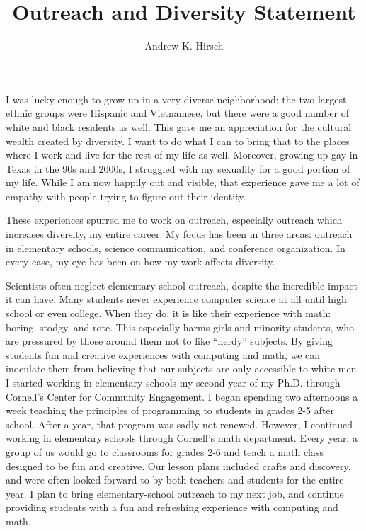 \documentclass{article}
\author{Andrew K. Hirsch}
\title{Outreach and Diversity Statement}
\date{}
\theoremstyle{definition}
\begin{document}
\maketitle

I was lucky enough to grow up in a very diverse neighborhood: the two largest ethnic groups were Hispanic and Vietnamese, but there were a good number of white and black residents as well.
This gave me an appreciation for the cultural wealth created by diversity.
I want to do what I can to bring that to the places where I work and live for the rest of my life as well.
Moreover, growing up gay in Texas in the 90s and 2000s, I struggled with my sexuality for a good portion of my life.
While I am now happily out and visible, that experience gave me a lot of empathy with people trying to figure out their identity.

These experiences spurred me to work on outreach, especially outreach which increases diversity, my entire career.
My focus has been in three areas: outreach in elementary schools, science communication, and conference organization.
In every case, my eye has been on how my work affects diversity.

Scientists often neglect elementary-school outreach, despite the incredible impact it can have.
Many students never experience computer science at all until high school or even college.
When they do, it is like their experience with math: boring, stodgy, and rote.
This especially harms girls and minority students, who are pressured by those around them not to like ``nerdy'' subjects.
By giving students fun and creative experiences with computing and math, we can inoculate them from believing that our subjects are only accessible to white men.
I started working in elementary schools my second year of my Ph.D. through Cornell's Center for Community Engagement.
I began spending two afternoons a week teaching the principles of programming to students in grades 2-5 after school.
After a year, that program was sadly not renewed.
However, I continued working in elementary schools through Cornell's math department.
Every year, a group of us would go to classrooms for grades 2-6 and teach a math class designed to be fun and creative.
Our lesson plans included crafts and discovery, and were often looked forward to by both teachers and students for the entire year.
I plan to bring elementary-school outreach to my next job, and continue providing students with a fun and refreshing experience with computing and math.
\end{document}
